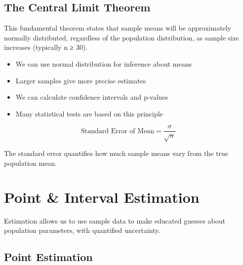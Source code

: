 \documentclass[
  11pt,
  letterpaper,
  oneside]{book}
\providecommand{\tightlist}{%
  \setlength{\itemsep}{0pt}\setlength{\parskip}{0pt}}\usepackage{longtable,booktabs,array}
\begin{document}
\subsection{The Central Limit Theorem}\label{the-central-limit-theorem}

This fundamental theorem states that sample means will be approximately
normally distributed, regardless of the population distribution, as
sample size increases (typically n ≥ 30).

\begin{tcolorbox}[enhanced jigsaw, left=2mm, opacityback=0, titlerule=0mm, leftrule=.75mm, colbacktitle=quarto-callout-note-color!10!white, title=\textcolor{quarto-callout-note-color}{\faInfo}\hspace{0.5em}{Implications of Central Limit Theorem}, breakable, opacitybacktitle=0.6, rightrule=.15mm, colframe=quarto-callout-note-color-frame, toprule=.15mm, bottomrule=.15mm, bottomtitle=1mm, toptitle=1mm, coltitle=black, arc=.35mm, colback=white]

\begin{itemize}
\tightlist
\item
  We can use normal distribution for inference about means
\item
  Larger samples give more precise estimates
\item
  We can calculate confidence intervals and p-values
\item
  Many statistical tests are based on this principle
\end{itemize}

\end{tcolorbox}

\[\text{Standard Error of Mean} = \frac{\sigma}{\sqrt{n}}\]

The standard error quantifies how much sample means vary from the true
population mean.

\section{Point \& Interval Estimation}\label{point-interval-estimation}

Estimation allows us to use sample data to make educated guesses about
population parameters, with quantified uncertainty.

\subsection{Point Estimation}\label{point-estimation}
\end{document}
